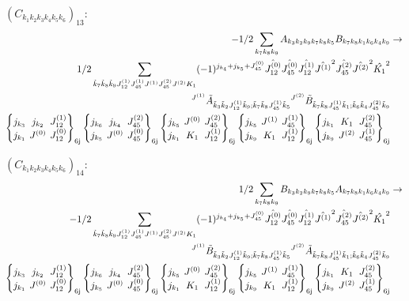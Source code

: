 \documentclass[11pt]{article}
\newcommand{\sixj}[6]{\begingroup\setlength{\arraycolsep}{0.2em}\begin{Bmatrix} #1 & #2 & #3 \\ #4 & #5 & #6 \end{Bmatrix}_{\text{6j}}\endgroup}
\begin{document}
$\left({C}_{{k}_{1}{k}_{2}{k}_{3}{k}_{4}{k}_{5}{k}_{6}}\right)_{13}$:
\begin{align}
-1/2\sum_{{k}_{7}{k}_{8}{k}_{9}}{A}_{{k}_{3}{k}_{2}{k}_{9}{k}_{7}{k}_{8}{k}_{5}}{B}_{{k}_{7}{k}_{8}{k}_{1}{k}_{6}{k}_{4}{k}_{9}}&\rightarrow \notag \\1/2\sum_{\tilde{k}_{7}\tilde{k}_{8}\tilde{k}_{9}J^{(1)}_{12}J^{(1)}_{45}J^{(1)}J^{(2)}_{45}J^{(2)}K_{1}}(-1)^{j_{{k}_{4}} +j_{{k}_{5}} +J^{(0)}_{45} }\hat{J^{(0)}_{12}}\hat{J^{(0)}_{45}}\hat{J^{(1)}_{12}}\hat{J^{(1)}}^{2}\hat{J^{(2)}_{45}}\hat{J^{(2)}}^{2}\hat{K_{1}}^{2}& \notag \\{}^{J^{(1)}}\tilde{A}_{\tilde{k}_{3}\tilde{k}_{2}J^{(1)}_{12}\tilde{k}_{9};\tilde{k}_{7}\tilde{k}_{8}J^{(1)}_{45}\tilde{k}_{5}}{}^{J^{(2)}}\tilde{B}_{\tilde{k}_{7}\tilde{k}_{8}J^{(1)}_{45}\tilde{k}_{1};\tilde{k}_{6}\tilde{k}_{4}J^{(2)}_{45}\tilde{k}_{9}}& \notag \\\sixj{j_{{k}_{3}}}{j_{{k}_{2}}}{J^{(1)}_{12}}{j_{{k}_{1}}}{J^{(0)}}{J^{(0)}_{12}}\sixj{j_{{k}_{6}}}{j_{{k}_{4}}}{J^{(2)}_{45}}{j_{{k}_{5}}}{J^{(0)}}{J^{(0)}_{45}}\sixj{j_{{k}_{5}}}{J^{(0)}}{J^{(2)}_{45}}{j_{{k}_{1}}}{K_{1}}{J^{(1)}_{12}}\sixj{j_{{k}_{5}}}{J^{(1)}}{J^{(1)}_{45}}{j_{{k}_{9}}}{K_{1}}{J^{(1)}_{12}}\sixj{j_{{k}_{1}}}{K_{1}}{J^{(2)}_{45}}{j_{{k}_{9}}}{J^{(2)}}{J^{(1)}_{45}}
\end{align}

$\left({C}_{{k}_{1}{k}_{2}{k}_{3}{k}_{4}{k}_{5}{k}_{6}}\right)_{14}$:
\begin{align}
1/2\sum_{{k}_{7}{k}_{8}{k}_{9}}{B}_{{k}_{3}{k}_{2}{k}_{9}{k}_{7}{k}_{8}{k}_{5}}{A}_{{k}_{7}{k}_{8}{k}_{1}{k}_{6}{k}_{4}{k}_{9}}&\rightarrow \notag \\-1/2\sum_{\tilde{k}_{7}\tilde{k}_{8}\tilde{k}_{9}J^{(1)}_{12}J^{(1)}_{45}J^{(1)}J^{(2)}_{45}J^{(2)}K_{1}}(-1)^{j_{{k}_{4}} +j_{{k}_{5}} +J^{(0)}_{45} }\hat{J^{(0)}_{12}}\hat{J^{(0)}_{45}}\hat{J^{(1)}_{12}}\hat{J^{(1)}}^{2}\hat{J^{(2)}_{45}}\hat{J^{(2)}}^{2}\hat{K_{1}}^{2}& \notag \\{}^{J^{(1)}}\tilde{B}_{\tilde{k}_{3}\tilde{k}_{2}J^{(1)}_{12}\tilde{k}_{9};\tilde{k}_{7}\tilde{k}_{8}J^{(1)}_{45}\tilde{k}_{5}}{}^{J^{(2)}}\tilde{A}_{\tilde{k}_{7}\tilde{k}_{8}J^{(1)}_{45}\tilde{k}_{1};\tilde{k}_{6}\tilde{k}_{4}J^{(2)}_{45}\tilde{k}_{9}}& \notag \\\sixj{j_{{k}_{3}}}{j_{{k}_{2}}}{J^{(1)}_{12}}{j_{{k}_{1}}}{J^{(0)}}{J^{(0)}_{12}}\sixj{j_{{k}_{6}}}{j_{{k}_{4}}}{J^{(2)}_{45}}{j_{{k}_{5}}}{J^{(0)}}{J^{(0)}_{45}}\sixj{j_{{k}_{5}}}{J^{(0)}}{J^{(2)}_{45}}{j_{{k}_{1}}}{K_{1}}{J^{(1)}_{12}}\sixj{j_{{k}_{5}}}{J^{(1)}}{J^{(1)}_{45}}{j_{{k}_{9}}}{K_{1}}{J^{(1)}_{12}}\sixj{j_{{k}_{1}}}{K_{1}}{J^{(2)}_{45}}{j_{{k}_{9}}}{J^{(2)}}{J^{(1)}_{45}}
\end{align}
\end{document}
